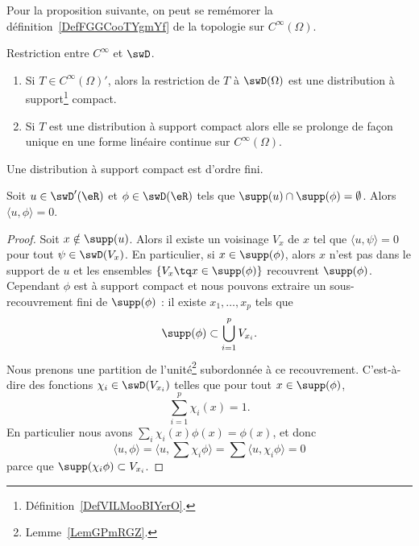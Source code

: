 Pour la proposition suivante, on peut se remémorer la définition~\ref{DefFGGCooTYgmYf} de la topologie sur \(  C^{\infty}(\Omega)\).
\begin{proposition}
    Restriction entre \(  C^{\infty}\) et \( \swD\).
    \begin{enumerate}
        \item
            Si \( T\in C^{\infty}(\Omega)'\), alors la restriction de \( T\) à \( \swD(\Omega)\) est une distribution à support\footnote{Définition~\ref{DefVILMooBIYerO}.} compact.
        \item
            Si \( T\) est une distribution à support compact alors elle se prolonge de façon unique en une forme linéaire continue sur \(  C^{\infty}(\Omega)\).
    \end{enumerate}
\end{proposition}

\begin{proposition}     \label{PropZLUEooHcVxQj}
    Une distribution à support compact est d'ordre fini.
\end{proposition}

\begin{lemma}   \label{LemYHRDooOdSnnK}
    Soit \( u\in\swD'(\eR)\) et \( \phi\in\swD(\eR)\) tels que \( \supp(u)\cap\supp(\phi)=\emptyset\). Alors \( \langle u, \phi\rangle =0\).
\end{lemma}

\begin{proof}
    Soit \( x\notin\supp(u)\). Alors il existe un voisinage \( V_x\) de \( x\) tel que \( \langle u, \psi\rangle =0\) pour tout \( \psi\in\swD(V_x)\). En particulier, si \( x\in\supp(\phi)\), alors \( x\) n'est pas dans le support de \( u\) et les ensembles \( \{ V_x\tq x\in\supp(\phi) \}\) recouvrent \( \supp(\phi)\). Cependant \( \phi\) est à support compact et nous pouvons extraire un sous-recouvrement fini de \( \supp(\phi)\) : il existe \( x_1,\ldots, x_p\) tels que
    \begin{equation}
        \supp(\phi)\subset\bigcup_{i=1}^pV_{x_i}.
    \end{equation}
    Nous prenons une partition de l'unité\footnote{Lemme~\ref{LemGPmRGZ}.} subordonnée à ce recouvrement. C'est-à-dire des fonctions \( \chi_i\in\swD(V_{x_i})\) telles que pour tout \( x\in\supp(\phi)\),
    \begin{equation}
        \sum_{i=1}^p\chi_i(x)=1.
    \end{equation}
    En particulier nous avons \( \sum_i\chi_i(x)\phi(x)=\phi(x)\), et donc
    \begin{equation}
        \langle u, \phi\rangle =\langle u, \sum \chi_i\phi\rangle =\sum\langle u, \chi_i\phi\rangle =0
    \end{equation}
    parce que \( \supp(\chi_i\phi)\subset V_{x_i}\).
\end{proof}

